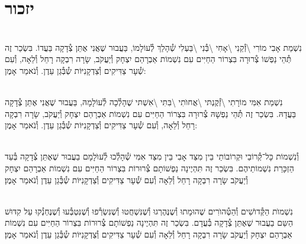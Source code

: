 \documentclass[twoside, openany, parskip=half, 11pt]{book}
\begin{document}
\vfill
{}


\sepline



\chapter[יזכור]{ יזכור }

 

\\
נִשְׁמַת אָבִי מוֹרִי \textbackslash זְ֯קֵנִי \textbackslash אָחִי \textbackslash בְּ֯נִי \textbackslash בַּעְלִי  שְׁ֯הָלַךְ לְ֯עוֹלָמוֹ, בַּעֲבוּר שֶׁאֲנִי אֶתֵּן צְ֯דָקָה בַּעֲדוֹ. בִּשְׂכַר זֶה תְּ֯הֵי נַפְשׁוֹ צְ֯רוּרָה בִּצְרוֹר הַחַיִּים עִם נִשְׁמוֹת אַבְרָהַם יִצְחָק וְ֯יַעֲקֹב, שָׂרָה רִבְקָה רָחֵל וְ֯לֵאָה, וְ֯עִם שְׁ֯עָר צַדִּיקִים וְ֯צַדְקָנִיּוֹת שְ֯בְּ֯גַן עֵדֶן. וְ֯נֹאמַר אָמֶן:

\\
נִשְׁמַת אִמִּי מוֹרָתִי \textbackslash זְ֯קֶנְתּי \textbackslash אֲחוׂתִי \textbackslash בִּתִּי \textbackslash אִשְׁתּי
שֶׁהָלְ֯כָה לְ֯עוֹלָמָהּ, בַּעֲבוּר שֶׁאֲנִי אֶתֵּן צְ֯דָקָה בַּעֲדָהּ. בִּשְׂכַר זֶה תְּ֯הֵי נַפְשָׁהּ צְ֯רוּרָה בִּצְרוֹר הַחַיִּים עִם נִשְׁמוֹת אַבְרָהַם יִצְחָק וְ֯יַעֲקֹב, שָׂרָה רִבְקָה רָחֵל וְ֯לֵאָה, וְ֯עִם שְׁ֯עָר צַדִּיקִים וְ֯צַדְקָנִיּוֹת שְ֯בְּ֯גַן עֵדֶן. וְ֯נֹאמַר אָמֶן:

 \\
וְ֯נִשְׁמוֹת כָּל־קְ֯רוֹבַי וּקְרוֹבוֹתַי בֵּין מִצַּד אָבִי בֵּין מִצַּד אִמִּי
שְׁ֯הָלְ֯כוּ לְ֯עוׂלָמָם
בַעֲבוּר שֶׁאֶתֵּן צְ֯דָקָה בְּ֯עַד הַזְכָּרַת נִשְׁמוֹתֵיהֶם. בִּשְׂכַר זֶה תִּהְיֶינָה נַפְשׁוֹתָם צְ֯רוּרוֹת בִּצְרוֹר הַחַיִּים עִם נִשְׁמוֹת אַבְרָהַם יִצְחָק וְ֯יַעֲקֹב שָׂרָה רִבְקָה רָחֵל וְ֯לֵאָה וְ֯עִם שְׁ֯עָר צַדִּיקִים וְ֯צַדְקָנִיּוֹת שְ֯בְּ֯גַן עֵדֶן וְ֯נֹאמַר אָמֶן׃



\\
נִשְׁמוׂת הַקְּ֯דוׂשִׁים וְ֯הַטְּ֯הוׂרִים
שֶׁהוּמָתוּ וְ֯שֶנֶּהֶרְגוּ וְ֯שֶׁנִּשְׁחֲטוּ וְ֯שֶׁנִּשְׂרְ֯פוּ וְ֯שֶׁנִּטְבְּ֯עוּ וְ֯שֶׁנֶּחְנְ֯קוּ עַל קִדּוּשׁ הַשֵּם בַעֲבוּר שֶׁאֶתֵּן צְ֯דָקָה בְּ֯עֲדָם. בִּשְׂכַר זֶה תִּהְיֶינָה נַפְשׁוֹתָם צְ֯רוּרוֹת בִּצְרוֹר הַחַיִּים עִם נִשְׁמוֹת אַבְרָהַם יִצְחָק וְ֯יַעֲקֹב שָׂרָה רִבְקָה רָחֵל וְ֯לֵאָה וְ֯עִם שְׁ֯עָר צַדִּיקִים וְ֯צַדְקָנִיּוֹת שְ֯בְּ֯גַן עֵדֶן וְ֯נֹאמַר אָמֶן׃
%
\end{document}
